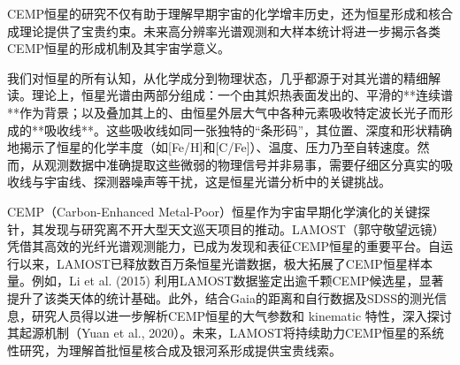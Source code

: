 CEMP恒星的研究不仅有助于理解早期宇宙的化学增丰历史，还为恒星形成和核合成理论提供了宝贵约束。未来高分辨率光谱观测和大样本统计将进一步揭示各类CEMP恒星的形成机制及其宇宙学意义。

我们对恒星的所有认知，从化学成分到物理状态，几乎都源于对其光谱的精细解读。理论上，恒星光谱由两部分组成：一个由其炽热表面发出的、平滑的**连续谱**作为背景；以及叠加其上的、由恒星外层大气中各种元素吸收特定波长光子而形成的**吸收线**。这些吸收线如同一张独特的“条形码”，其位置、深度和形状精确地揭示了恒星的化学丰度（如[Fe/H]和[C/Fe]）、温度、压力乃至自转速度。然而，从观测数据中准确提取这些微弱的物理信号并非易事，需要仔细区分真实的吸收线与宇宙线、探测器噪声等干扰，这是恒星光谱分析中的关键挑战。

CEMP（Carbon-Enhanced Metal-Poor）恒星作为宇宙早期化学演化的关键探针，其发现与研究离不开大型天文巡天项目的推动。LAMOST（郭守敬望远镜）凭借其高效的光纤光谱观测能力，已成为发现和表征CEMP恒星的重要平台。自运行以来，LAMOST已释放数百万条恒星光谱数据，极大拓展了CEMP恒星样本量。例如，Li et al. (2015)\cite{li2015} 利用LAMOST数据鉴定出逾千颗CEMP候选星，显著提升了该类天体的统计基础。此外，结合Gaia的距离和自行数据及SDSS的测光信息，研究人员得以进一步解析CEMP恒星的大气参数和 kinematic 特性，深入探讨其起源机制（Yuan et al., 2020）\cite{yuan2020}。未来，LAMOST将持续助力CEMP恒星的系统性研究，为理解首批恒星核合成及银河系形成提供宝贵线索。

